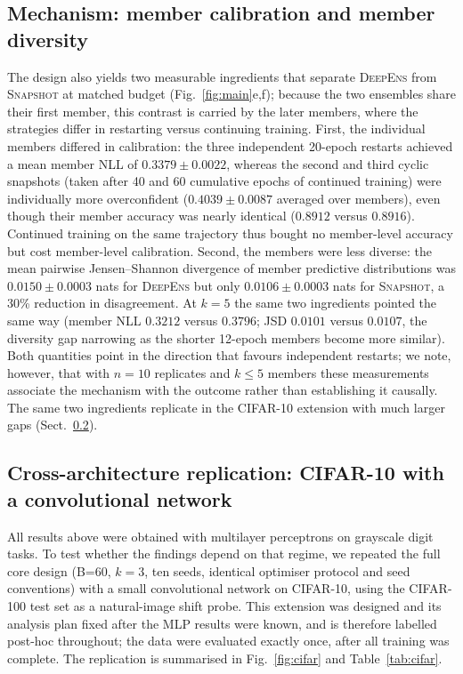 \documentclass[11pt,a4paper]{article}
\newcommand{\deepens}{\textsc{DeepEns}}
\newcommand{\snapshot}{\textsc{Snapshot}}
\begin{document}
\subsection{Mechanism: member calibration and member diversity}
\label{sec:results-mech}

The design also yields two measurable ingredients that separate
\deepens{} from \snapshot{} at matched
budget (Fig.~\ref{fig:main}e,f); because the two ensembles share their
first member, this contrast is carried by the later members, where the
strategies differ in restarting versus continuing training. First, the
individual members differed in calibration: the three independent 20-epoch
restarts achieved a mean member NLL of $0.3379 \pm 0.0022$, whereas the
second and third cyclic snapshots (taken after 40 and 60 cumulative epochs
of continued training) were individually more overconfident ($0.4039 \pm
0.0087$ averaged over members), even though their member accuracy was
nearly identical ($0.8912$ versus $0.8916$). Continued training on the
same trajectory thus bought no member-level accuracy but cost
member-level calibration. Second, the members were less diverse: the mean
pairwise Jensen--Shannon divergence of member predictive distributions was
$0.0150 \pm 0.0003$ nats for \deepens{} but only $0.0106 \pm 0.0003$ nats
for \snapshot{}, a 30\% reduction in disagreement. At $k=5$ the same two
ingredients pointed the same way (member NLL $0.3212$ versus $0.3796$; JSD
$0.0101$ versus $0.0107$, the diversity gap narrowing as the shorter
12-epoch members become more similar). Both quantities point in the
direction that favours independent restarts; we note, however, that with
$n=10$ replicates and $k \leq 5$ members these measurements associate the
mechanism with the outcome rather than establishing it causally. The same
two ingredients replicate in the CIFAR-10 extension with much larger gaps
(Sect.~\ref{sec:results-cifar}).

\subsection{Cross-architecture replication: CIFAR-10 with a convolutional
network}\label{sec:results-cifar}

All results above were obtained with multilayer perceptrons on grayscale
digit tasks. To test whether the findings depend on that regime, we repeated
the full core design (B=60, $k=3$, ten seeds, identical optimiser protocol
and seed conventions) with a small convolutional network on CIFAR-10, using
the CIFAR-100 test set as a natural-image shift probe. This extension was
designed and its analysis plan fixed after the MLP results were known, and
is therefore labelled post-hoc throughout; the data were evaluated exactly
once, after all training was complete. The replication is summarised in
Fig.~\ref{fig:cifar} and Table~\ref{tab:cifar}.
\end{document}
